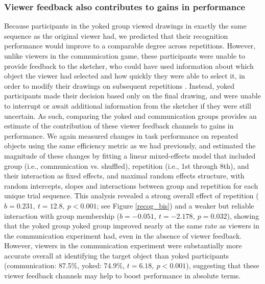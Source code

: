 \documentclass[10pt,letterpaper]{article}
\begin{document}
\subsubsection{Viewer feedback also contributes to gains in performance}

Because participants in the yoked group viewed drawings in exactly the same sequence as the original viewer had, we predicted that their recognition performance would improve to a comparable degree across repetitions. 
However, unlike viewers in the communication game, these participants were unable to provide feedback to the sketcher, who could have used information about which object the viewer had selected and how quickly they were able to select it, in order to modify their drawings on subsequent repetitions \cite{schober_understanding_1989}. 
Instead, yoked participants made their decision based only on the final drawing, and were unable to interrupt or await additional information from the sketcher if they were still uncertain.
As such, comparing the yoked and communication groups provides an estimate of the contribution of these viewer feedback channels to gains in performance. 
We again measured changes in task performance on repeated objects using the same efficiency metric as we had previously, and estimated the magnitude of these changes by fitting a linear mixed-effects model that included group (i.e., communication vs. shuffled), repetition (i.e., 1st through 8th), and their interaction as fixed effects, and maximal random effects structure, with random intercepts, slopes and interactions between group and repetition for each unique trial sequence. 
This analysis revealed a strong overall effect of repetition ($b = 0.231, ~t = 12.8,~p < 0.001$; see Figure \ref{recog_bis}) and a weaker but reliable interaction with group membership ($b = -0.051, ~t = -2.178, ~p = 0.032$), showing that the yoked group yoked group improved nearly at the same rate as viewers in the communication experiment had, even in the absence of viewer feedback. %
However, viewers in the communication experiment were substantially more accurate overall at identifying the target object than yoked participants (communication: 87.5\%, yoked: 74.9\%, $t = 6.18, ~p < 0.001$), suggesting that these viewer feedback channels may help to boost performance in absolute terms. %

\end{document}
